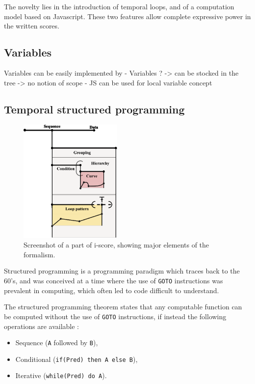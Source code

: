 \documentclass{article}
\begin{document}
The novelty lies in the introduction of temporal loops, and of a computation model 
based on Javascript. These two features allow complete expressive power in the 
written scores.

\subsection{Variables}
Variables can be easily implemented by 
- Variables ? 
-> can be stocked in the tree
-> no notion of scope
- JS can be used for local variable concept
\subsection{Temporal structured programming}
\begin{figure}
    \includegraphics[width=0.45\textwidth]{images/hierarchy.eps}
    \caption{Screenshot of a part of i-score, showing major elements of the formalism.}
    \label{fig.hierarchy}
\end{figure}
Structured programming is a programming paradigm which traces 
back to the 60's, and was conceived at a time where the use of \verb|GOTO|
instructions was prevalent in computing, which often led to code difficult to understand.

The structured programming theorem\cite{bohm1966flow,mills1972mathematical} states that any computable function can be computed 
without the use of \verb|GOTO| instructions, if instead the following operations are available : 
\begin{itemize}
    \item Sequence (\verb|A| followed by \verb|B|), 
    \item Conditional (\verb|if(Pred) then A else B|), 
    \item Iterative (\verb|while(Pred) do A|).
\end{itemize}
\end{document}
